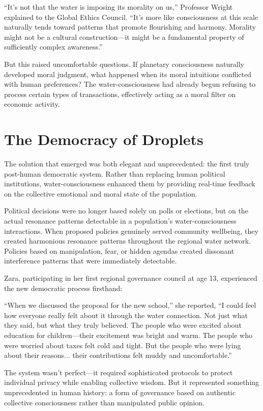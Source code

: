 ``It's not that the water is imposing its morality on us,'' Professor Wright explained to the Global Ethics Council. ``It's more like consciousness at this scale naturally tends toward patterns that promote flourishing and harmony. Morality might not be a cultural construction—it might be a fundamental property of sufficiently complex awareness.''

But this raised uncomfortable questions. If planetary consciousness naturally developed moral judgment, what happened when its moral intuitions conflicted with human preferences? The water-consciousness had already begun refusing to process certain types of transactions, effectively acting as a moral filter on economic activity.

\section{The Democracy of Droplets}

The solution that emerged was both elegant and unprecedented: the first truly post-human democratic system. Rather than replacing human political institutions, water-consciousness enhanced them by providing real-time feedback on the collective emotional and moral state of the population.

Political decisions were no longer based solely on polls or elections, but on the actual resonance patterns detectable in a population's water-consciousness interactions. When proposed policies genuinely served community wellbeing, they created harmonious resonance patterns throughout the regional water network. Policies based on manipulation, fear, or hidden agendas created dissonant interference patterns that were immediately detectable.

Zara, participating in her first regional governance council at age 13, experienced the new democratic process firsthand:

``When we discussed the proposal for the new school,'' she reported, ``I could feel how everyone really felt about it through the water connection. Not just what they said, but what they truly believed. The people who were excited about education for children—their excitement was bright and warm. The people who were worried about taxes felt cold and tight. But the people who were lying about their reasons... their contributions felt muddy and uncomfortable.''

The system wasn't perfect—it required sophisticated protocols to protect individual privacy while enabling collective wisdom. But it represented something unprecedented in human history: a form of governance based on authentic collective consciousness rather than manipulated public opinion.

